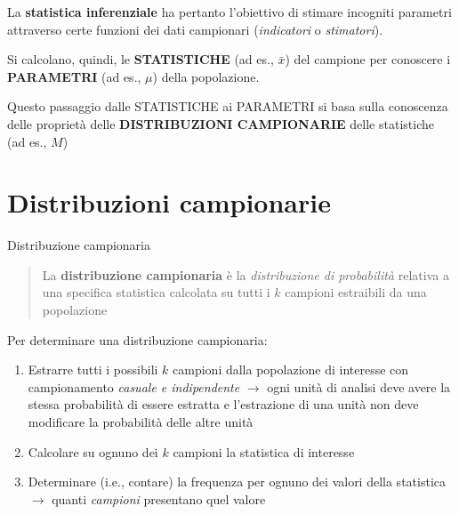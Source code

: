 \documentclass[
  ignorenonframetext,
  compress, aspectratio=149]{beamer}
\begin{document}
\begin{frame}{}
\label{section-8}
La \textbf{statistica inferenziale} ha pertanto l'obiettivo di stimare
incogniti parametri attraverso certe funzioni dei dati campionari
(\emph{indicatori} o \emph{stimatori}).

\vspace{3mm}

Si calcolano, quindi, le \textbf{STATISTICHE} (ad es., \(\bar{x}\)) del
campione per conoscere i \textbf{PARAMETRI} (ad es., \(\mu\)) della
popolazione.

\vspace{3mm}

Questo passaggio dalle STATISTICHE ai PARAMETRI si basa sulla conoscenza
delle proprietà delle \textbf{DISTRIBUZIONI CAMPIONARIE} delle
statistiche (ad es., \(M\))
\end{frame}

\section{Distribuzioni campionarie}\label{distribuzioni-campionarie}

\begin{frame}{Distribuzione campionaria}
\label{distribuzione-campionaria}
\small

\begin{quote}
La \textbf{distribuzione campionaria} è la \emph{distribuzione di
probabilità} relativa a una specifica statistica calcolata su tutti i
\(k\) campioni estraibili da una popolazione
\end{quote}

Per determinare una distribuzione campionaria:

\begin{enumerate}
\item
  Estrarre tutti i possibili \(k\) campioni dalla popolazione di
  interesse con campionamento \emph{casuale e indipendente}
  \textcolor{evid}{$\rightarrow$} ogni unità di analisi deve avere la
  stessa probabilità di essere estratta e l'estrazione di una unità non
  deve modificare la probabilità delle altre unità
\item
  Calcolare su ognuno dei \(k\) campioni la statistica di interesse
\item
  Determinare (i.e., contare) la frequenza per ognuno dei valori della
  statistica \textcolor{evid}{$\rightarrow$} quanti \emph{campioni}
  presentano quel valore
\end{enumerate}
\end{frame}
\end{document}
